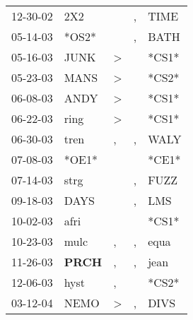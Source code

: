 \begin{supertabular}{p{0.07\textwidth}p{0.06\textwidth}p{0.02\textwidth}p{0.02\textwidth}p{0.06\textwidth}}
 12-30-02\textsuperscript{} &            2X2\textsuperscript{} &                  &             , &         TIME\textsuperscript{} \\
 05-14-03\textsuperscript{} &                            *OS2* &                  &             , &         BATH\textsuperscript{} \\
 05-16-03\textsuperscript{} &           JUNK\textsuperscript{} &     \textgreater &               &                          *CS1* \\
 05-23-03\textsuperscript{} &           MANS\textsuperscript{} &     \textgreater &               &                          *CS2* \\
 06-08-03\textsuperscript{} &           ANDY\textsuperscript{} &     \textgreater &               &                          *CS1* \\
 06-22-03\textsuperscript{} &           ring\textsuperscript{} &     \textgreater &               &                          *CS1* \\
 06-30-03\textsuperscript{} &           tren\textsuperscript{} &                , &             , &         WALY\textsuperscript{} \\
 07-08-03\textsuperscript{} &                            *OE1* &                  &               &                          *CE1* \\
 07-14-03\textsuperscript{} &           strg\textsuperscript{} &                  &             , &         FUZZ\textsuperscript{} \\
 09-18-03\textsuperscript{} &           DAYS\textsuperscript{} &                  &             , &          LMS\textsuperscript{} \\
 10-02-03\textsuperscript{} &           afri\textsuperscript{} &                  &               &                          *CS1* \\
 10-23-03\textsuperscript{} &           mulc\textsuperscript{} &                , &             , &         equa\textsuperscript{} \\
 11-26-03\textsuperscript{} &  \textbf{PRCH\textsuperscript{}} &                , &             , &         jean\textsuperscript{} \\
 12-06-03\textsuperscript{} &           hyst\textsuperscript{} &                , &               &                          *CS2* \\
 03-12-04\textsuperscript{} &           NEMO\textsuperscript{} &     \textgreater &             , &         DIVS\textsuperscript{} \\

\end{supertabular}
